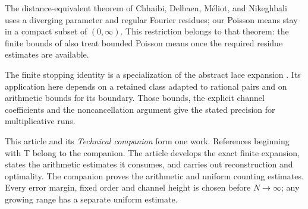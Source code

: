 The distance-equivalent theorem of
Chhaibi, Delbaen, M\'eliot, and Nikeghbali
\cite[Theorem~3.11]{chhaibietal2020} uses a diverging parameter and
regular Fourier residues; our Poisson means stay in a compact
subset of \((0,\infty)\). This restriction belongs to that theorem:
the finite bounds of \cite[Theorem~5.1]{bkn2014} also treat bounded
Poisson means once the required residue estimates are available.

The finite stopping identity is a specialization of the abstract
lace expansion \cite{zeilberger1997}. Its application here depends
on a retained class adapted to rational pairs and on arithmetic
bounds for its boundary. Those bounds, the explicit channel
coefficients and the noncancellation argument give the stated
precision for multiplicative runs.

This article and its \emph{Technical companion} form one work.
References beginning with T belong to the companion. The article
develops the exact finite expansion, states the arithmetic estimates
it consumes, and carries out reconstruction and optimality. The
companion proves the arithmetic and uniform counting estimates.
Every error margin, fixed order and channel height is chosen before
\(N\to\infty\); any growing range has a separate uniform estimate.
\label{p1:intro:notation}
